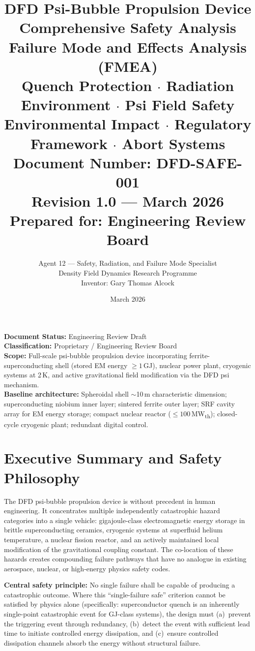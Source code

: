 \documentclass[11pt,a4paper]{article}
\title{
  \textbf{\Huge DFD Psi-Bubble Propulsion Device}\\[8pt]
  \textbf{\large Comprehensive Safety Analysis}\\[6pt]
  \normalsize Failure Mode and Effects Analysis (FMEA)\\
  Quench Protection $\cdot$ Radiation Environment $\cdot$ Psi Field Safety\\
  Environmental Impact $\cdot$ Regulatory Framework $\cdot$ Abort Systems\\[8pt]
  \normalsize Document Number: DFD-SAFE-001\\
  Revision 1.0 --- March 2026\\[4pt]
  \small Prepared for: Engineering Review Board
}
\author{
  Agent 12 --- Safety, Radiation, and Failure Mode Specialist\\
  \small Density Field Dynamics Research Programme\\
  \small Inventor: Gary Thomas Alcock
}
\date{March 2026}
\begin{document}
\maketitle
\thispagestyle{empty}

\begin{tcolorbox}[colback=gray!10, colframe=black]
\textbf{Document Status:} Engineering Review Draft \\
\textbf{Classification:} Proprietary / Engineering Review Board\\
\textbf{Scope:} Full-scale psi-bubble propulsion device incorporating
ferrite-superconducting shell (stored EM energy $\geq 1$\,GJ),
nuclear power plant, cryogenic systems at 2\,K, and active
gravitational field modification via the DFD psi mechanism. \\
\textbf{Baseline architecture:} Spheroidal shell $\sim$10\,m
characteristic dimension; superconducting niobium inner layer;
sintered ferrite outer layer; SRF cavity array for EM energy storage;
compact nuclear reactor ($\leq 100$\,MW\textsubscript{th}); closed-cycle
cryogenic plant; redundant digital control.
\end{tcolorbox}

\newpage
\tableofcontents
\newpage

\section{Executive Summary and Safety Philosophy}

The DFD psi-bubble propulsion device is without precedent in human
engineering. It concentrates multiple independently catastrophic
hazard categories into a single vehicle: gigajoule-class electromagnetic
energy storage in brittle superconducting ceramics, cryogenic systems
at superfluid helium temperature, a nuclear fission reactor, and an
actively maintained local modification of the gravitational coupling
constant. The co-location of these hazards creates compounding failure
pathways that have no analogue in existing aerospace, nuclear, or
high-energy physics safety codes.

\textbf{Central safety principle:} No single failure shall be capable
of producing a catastrophic outcome. Where this ``single-failure safe''
criterion cannot be satisfied by physics alone (specifically: superconductor
quench is an inherently single-point catastrophic event for GJ-class
systems), the design must (a)~prevent the triggering event through
redundancy, (b)~detect the event with sufficient lead time to initiate
controlled energy dissipation, and (c)~ensure controlled dissipation
channels absorb the energy without structural failure.
\end{document}

